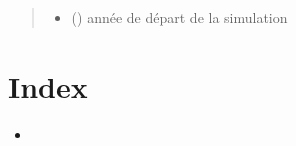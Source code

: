 \documentclass[letterpaper,10pt,french]{sphinxmanual}
\begin{document}
\begin{fulllineitems}
\begin{fulllineitems}
\begin{quote}
\begin{description}
\begin{itemize}
\item {} 
 () \textendash{} année de départ de la simulation

\end{itemize}

\end{description}\end{quote}

\end{fulllineitems}


\end{fulllineitems}



\chapter{Index}
\label{\detokenize{index:index}}\begin{itemize}
\item {} 

\end{itemize}


\renewcommand{\indexname}{Index des modules Python}
\begin{sphinxtheindex}
\let\bigletter\sphinxstyleindexlettergroup
\bigletter{s}
\item\relax{}
\end{sphinxtheindex}

\renewcommand{\indexname}{Index}
\printindex
\end{document}
